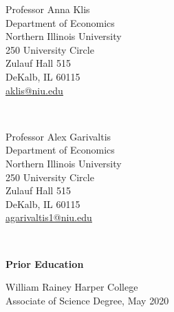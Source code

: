 \documentclass[final]{article}
\begin{document}
\begin{minipage}[t]{.80\textwidth}
\begin{minipage}{.40\textwidth}
		\end{minipage}
		\begin{minipage}{.40\textwidth}
			Professor Anna Klis \\
			Department of Economics \\
			Northern Illinois University \\
			250 University Circle \\
			Zulauf Hall 515 \\
			DeKalb, IL 60115 \\
			\underline{\href{mailto:aklis@niu.edu}{aklis@niu.edu}}\\
		\end{minipage} \\
		\begin{minipage}{.40\textwidth}
			Professor Alex Garivaltis \\
			Department of Economics \\
			Northern Illinois University \\
			250 University Circle \\
			Zulauf Hall 515 \\
			DeKalb, IL 60115 \\
			\underline{\href{mailto:agarivaltis1@niu.edu}{agarivaltis1@niu.edu}}\\
		\end{minipage} \\
	\end{minipage}
	
	
	
	\begin{minipage}[t]{.20\textwidth}
		\Large{\textbf{Prior  \mbox{Education}}}\\
	\end{minipage}
	\begin{minipage}[t]{.80\textwidth}
		William Rainey Harper College \\
		Associate of Science Degree, May 2020
	\end{minipage}\\
	
\end{document}
